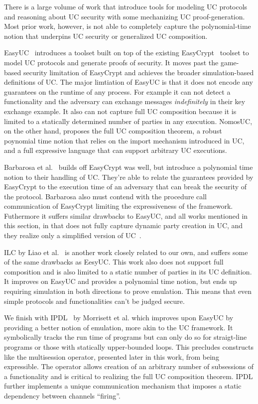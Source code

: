 There is a large volume of work that introduce tools for modeling UC protocols and reasoning about UC security with some mechanizing UC proof-generation.
Most prior work, however, is not able to completely capture the polynomial-time notion that underpins UC security or generalized UC composition. 

EasyUC~\cite{easyuc} introduces a toolset built on top of the existing EasyCrypt~\cite{easycrypt} toolset to model UC protocols and generate proofs of security.
It moves past the game-based security limitation of EasyCrypt and achieves the broader simulation-based definitions of UC.
The major limtiation of EasyUC is that it does not encode any guarantees on the runtime of any process.
For example it can not detect a functionality and the adversary can exchange messages \emph{indefinitely} in their key exchange example. It also can not capture full UC composition because it is limited to a statically determined number of parties in any execution.
NomosUC, on the other hand, proposes the full UC composition theorem, a robust poynomial time notion that relies on the import mechanism introduced in UC, and a full expressive language that can support arbitrary UC executions.

Barbarosa et al.~\cite{barbarosa} builds off EasyCrypt was well, but introduce a polynomial time notion to their handling of UC. 
They're able to relate the guarantees provided by EasyCrypt to the execution time of an adversary that can break the security of the protocol. 
Barbarosa also must contend with the procedure call communication of EasyCrypt limiting the expressiveness of the framework. 
Futhermore it suffers similar drawbacks to EasyUC, and all works mentioned in this section, in that does not fully capture dynamic party creation in UC, and they realize only a simplified version of UC~\cite{suc}.

ILC by Liao et al.~\cite{ilc} is another work closely related to our own, and suffers some of the same drawbacks as EesyUC. 
This work also does not support full composition and is also limited to a static number of parties in its UC definition.
It improves on EasyUC and provides a polynomial time notion, but ends up requiring simulation in both directions to prove emulation. This means that even simple protocols and functionalities can't be judged secure.

We finish with IPDL~\cite{ipdl} by Morrisett et al. which improves upon EasyUC by providing a better notion of emulation, more akin to the UC framework.
It symbolically tracks the run time of programs but can only do so for straigt-line programs or those with statically upper-bounded loops.
This precludes constructs like the multisession operator, presented later in this work, from being expressible. 
The operator allows creation of an arbitrary number of subsessions of a functionality and is critical to realizing the full UC composition theorem.
IPDL further implements a unique communication mechanism that imposes a static dependency between channels ``firing''.

